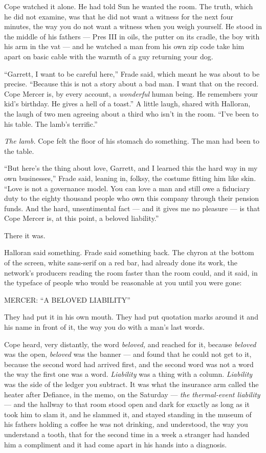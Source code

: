 \documentclass[11pt,openany]{book}
\begin{document}
Cope watched it alone. He had told Sun he wanted the room. The truth, which he did not examine, was that he did not want a witness for the next four minutes, the way you do not want a witness when you weigh yourself. He stood in the middle of his fathers --- Pres III in oils, the putter on its cradle, the boy with his arm in the vat --- and he watched a man from his own zip code take him apart on basic cable with the warmth of a guy returning your dog.

``Garrett, I want to be careful here,'' Frade said, which meant he was about to be precise. ``Because this is not a story about a bad man. I want that on the record. Cope Mercer is, by every account, a \textit{wonderful} human being. He remembers your kid's birthday. He gives a hell of a toast.'' A little laugh, shared with Halloran, the laugh of two men agreeing about a third who isn't in the room. ``I've been to his table. The lamb's terrific.''

\textit{The lamb.} Cope felt the floor of his stomach do something. The man had been to the table.

``But here's the thing about love, Garrett, and I learned this the hard way in my own businesses,'' Frade said, leaning in, folksy, the costume fitting him like skin. ``Love is not a governance model. You can love a man and still owe a fiduciary duty to the eighty thousand people who own this company through their pension funds. And the hard, unsentimental fact --- and it gives me no pleasure --- is that Cope Mercer is, at this point, a beloved liability.''

There it was.

Halloran said something. Frade said something back. The chyron at the bottom of the screen, white sans-serif on a red bar, had already done its work, the network's producers reading the room faster than the room could, and it said, in the typeface of people who would be reasonable at you until you were gone:

MERCER: ``A BELOVED LIABILITY''

They had put it in his own mouth. They had put quotation marks around it and his name in front of it, the way you do with a man's last words.

Cope heard, very distantly, the word \textit{beloved,} and reached for it, because \textit{beloved} was the open, \textit{beloved} was the banner --- and found that he could not get to it, because the second word had arrived first, and the second word was not a word the way the first one was a word. \textit{Liability} was a thing with a column. \textit{Liability} was the side of the ledger you subtract. It was what the insurance arm called the heater after Defiance, in the memo, on the Saturday --- \textit{the thermal-event liability} --- and the hallway to that room stood open and dark for exactly as long as it took him to slam it, and he slammed it, and stayed standing in the museum of his fathers holding a coffee he was not drinking, and understood, the way you understand a tooth, that for the second time in a week a stranger had handed him a compliment and it had come apart in his hands into a diagnosis.
\end{document}
